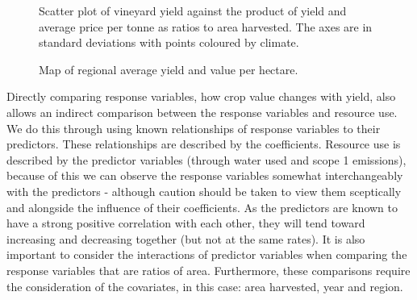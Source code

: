 \documentclass[review,12pt,authoryear]{elsarticle}
\begin{document}
\begin{linenumbers}
\begin{figure}
    \caption{Scatter plot of vineyard yield against the product of yield and average price per tonne as ratios to area harvested. The axes are in standard deviations with points coloured by climate.}
\end{figure}
%
\begin{figure}\label{fig:map}
  \caption{Map of regional average yield and value per hectare.}
\end{figure}
%
%
Directly comparing response variables, how crop value changes with yield, also allows an indirect comparison between the response variables and resource use. We do this through using known relationships of response variables to their predictors. These relationships are described by the coefficients. Resource use is described by the predictor variables (through water used and scope 1 emissions), because of this we can observe the response variables somewhat interchangeably with the predictors - although caution should be taken to view them sceptically and alongside the influence of their coefficients. As the predictors are known to have a strong positive correlation with each other, they will tend toward increasing and decreasing together (but not at the same rates). It is also important to consider the interactions of predictor variables when comparing the response variables that are ratios of area. Furthermore, these comparisons require the consideration of the covariates, in this case: area harvested, year and region.

\end{linenumbers}
\end{document}
